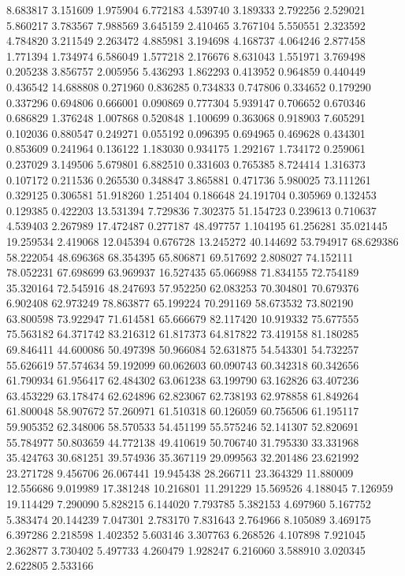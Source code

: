 8.683817
3.151609
1.975904
6.772183
4.539740
3.189333
2.792256
2.529021
5.860217
3.783567
7.988569
3.645159
2.410465
3.767104
5.550551
2.323592
4.784820
3.211549
2.263472
4.885981
3.194698
4.168737
4.064246
2.877458
1.771394
1.734974
6.586049
1.577218
2.176676
8.631043
1.551971
3.769498
0.205238
3.856757
2.005956
5.436293
1.862293
0.413952
0.964859
0.440449
0.436542
14.688808
0.271960
0.836285
0.734833
0.747806
0.334652
0.179290
0.337296
0.694806
0.666001
0.090869
0.777304
5.939147
0.706652
0.670346
0.686829
1.376248
1.007868
0.520848
1.100699
0.363068
0.918903
7.605291
0.102036
0.880547
0.249271
0.055192
0.096395
0.694965
0.469628
0.434301
0.853609
0.241964
0.136122
1.183030
0.934175
1.292167
1.734172
0.259061
0.237029
3.149506
5.679801
6.882510
0.331603
0.765385
8.724414
1.316373
0.107172
0.211536
0.265530
0.348847
3.865881
0.471736
5.980025
73.111261
0.329125
0.306581
51.918260
1.251404
0.186648
24.191704
0.305969
0.132453
0.129385
0.422203
13.531394
7.729836
7.302375
51.154723
0.239613
0.710637
4.539403
2.267989
17.472487
0.277187
48.497757
1.104195
61.256281
35.021445
19.259534
2.419068
12.045394
0.676728
13.245272
40.144692
53.794917
68.629386
58.222054
48.696368
68.354395
65.806871
69.517692
2.808027
74.152111
78.052231
67.698699
63.969937
16.527435
65.066988
71.834155
72.754189
35.320164
72.545916
48.247693
57.952250
62.083253
70.304801
70.679376
6.902408
62.973249
78.863877
65.199224
70.291169
58.673532
73.802190
63.800598
73.922947
71.614581
65.666679
82.117420
10.919332
75.677555
75.563182
64.371742
83.216312
61.817373
64.817822
73.419158
81.180285
69.846411
44.600086
50.497398
50.966084
52.631875
54.543301
54.732257
55.626619
57.574634
59.192099
60.062603
60.090743
60.342318
60.342656
61.790934
61.956417
62.484302
63.061238
63.199790
63.162826
63.407236
63.453229
63.178474
62.624896
62.823067
62.738193
62.978858
61.849264
61.800048
58.907672
57.260971
61.510318
60.126059
60.756506
61.195117
59.905352
62.348006
58.570533
54.451199
55.575246
52.141307
52.820691
55.784977
50.803659
44.772138
49.410619
50.706740
31.795330
33.331968
35.424763
30.681251
39.574936
35.367119
29.099563
32.201486
23.621992
23.271728
9.456706
26.067441
19.945438
28.266711
23.364329
11.880009
12.556686
9.019989
17.381248
10.216801
11.291229
15.569526
4.188045
7.126959
19.114429
7.290090
5.828215
6.144020
7.793785
5.382153
4.697960
5.167752
5.383474
20.144239
7.047301
2.783170
7.831643
2.764966
8.105089
3.469175
6.397286
2.218598
1.402352
5.603146
3.307763
6.268526
4.107898
7.921045
2.362877
3.730402
5.497733
4.260479
1.928247
6.216060
3.588910
3.020345
2.622805
2.533166
